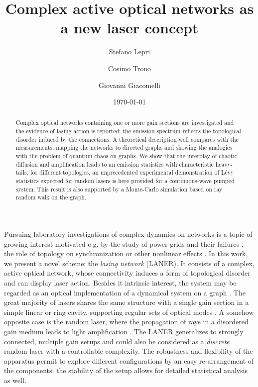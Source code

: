 \documentclass[aps,prl,twocolumn,showpacs,amsmath,amssymb,floatfix,superscriptaddress,
]{revtex4-1}
\begin{document}
\title{Complex active optical networks as a new laser concept}
\date{\today}


\author{Stefano Lepri}
\author{Cosimo Trono }
\author{Giovanni Giacomelli}

\begin{abstract} Complex optical networks containing one or more gain sections are investigated and the evidence of lasing action is reported; the emission spectrum reflects the topological disorder induced by the connections. A theoretical description well compares with the measurements, mapping the networks to directed graphs and showing the analogies with the problem of quantum chaos on graphs. We show that the interplay of chaotic diffusion and amplification leads to an emission statistics with characteristic heavy-tails: for different topologies, an unprecedented experimental demonstration of L\'evy statistics expected for random lasers is here provided for a continuous-wave pumped system. This result is also supported by a Monte-Carlo simulation based on ray random walk on the graph.
\end{abstract}

\maketitle

Pursuing laboratory investigations of complex dynamics on networks is a topic of growing interest motivated e.g. by the study of power grids and their failures \cite{Rohden2012}, the role of topology on synchronization \cite{belykh2005synchronization} or other nonlinear effects \cite{Gnutzmann2011,perakis2014small}. In this work, we present a novel scheme: the \textit{lasing network} (LANER). It consists of a complex, active optical network, whose connectivity induces a form of topological disorder and can display laser action. Besides it intrinsic interest, the system may be regarded as an optical implementation of a dynamical system on a graph \cite{Porter}. The great majority of lasers shares the same structure with a single gain section in a simple linear or ring cavity, supporting regular sets of optical modes \cite{milonni2010laser}. A somehow opposite case is the random laser, where the propagation of rays in a disordered gain medium leads to light amplification \cite{Cao2003,Wiersma2008}. The LANER generalizes to strongly connected, multiple gain setups and could also be considered as a \textit{discrete} random laser with a controllable complexity.  The robustness and flexibility of the apparatus permit to explore different configurations by an easy re-arrangement of the components; the stability of the setup allows for detailed statistical analysis as well.
\end{document}

